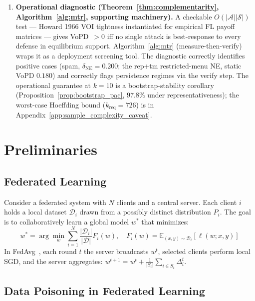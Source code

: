 \documentclass{article}
\begin{document}
\begin{enumerate}
objection that the rep+tm survivor is only deployable-but-not-NE-reachable under the standard 4-defense menu (§\ref{sec:lambda_c_sweep} $\lambda_c$ sweep).
    \item \textbf{Operational diagnostic (Theorem~\ref{thm:complementarity}, Algorithm~\ref{alg:mtr}, supporting machinery).} A checkable $O(|\mathcal{A}||\mathcal{S}|)$ test --- Howard 1966 VOI tightness instantiated for empirical FL payoff matrices --- gives VoPD~$>0$ iff no single attack is best-response to every defense in equilibrium support. Algorithm~\ref{alg:mtr} (measure-then-verify) wraps it as a deployment screening tool. The diagnostic correctly identifies positive cases (spam, $\delta_{\mathrm{NE}} = 0.200$; the rep+tm restricted-menu NE, static VoPD $0.180$) and correctly flags persistence regimes via the verify step. The operational guarantee at $k{=}10$ is a bootstrap-stability corollary (Proposition~\ref{prop:bootstrap_pac}, $97.8\%$ under representativeness); the worst-case Hoeffding bound ($k_{\mathrm{req}}=726$) is in Appendix~\ref{app:sample_complexity_caveat}.
\end{enumerate}

\section{Preliminaries}
\label{sec:prelim}

\subsection{Federated Learning}

Consider a federated system with $N$ clients and a central server. Each client $i$ holds a local dataset $\mathcal{D}_i$ drawn from a possibly distinct distribution $P_i$. The goal is to collaboratively learn a global model $w^*$ that minimizes:
\begin{equation}
    w^* = \arg\min_w \sum_{i=1}^{N} \frac{|\mathcal{D}_i|}{|\mathcal{D}|} F_i(w), \quad F_i(w) = \mathbb{E}_{(x,y)\sim \mathcal{D}_i}[\ell(w; x, y)]
\end{equation}
In FedAvg~\citep{mcmahan2017communication}, each round $t$ the server broadcasts $w^t$, selected clients perform local SGD, and the server aggregates: $w^{t+1} = w^t + \frac{1}{|S_t|}\sum_{i \in S_t} \Delta_i^t$.

\subsection{Data Poisoning in Federated Learning}
\end{document}
